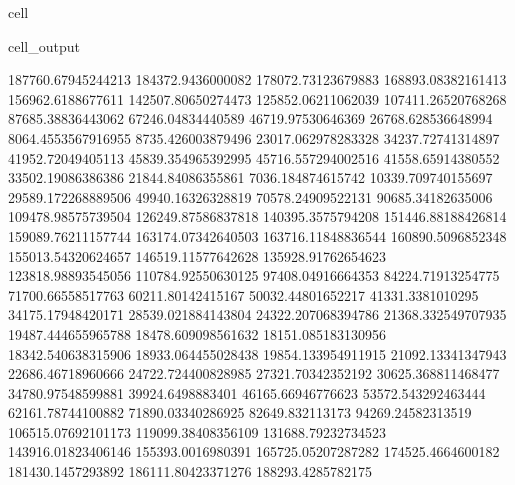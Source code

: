 \documentclass[letterpaper,10pt,english]{jupyterBook}
\begin{document}
\begin{sphinxuseclass}{cell}
\begin{sphinxVerbatimOutput}
\begin{sphinxuseclass}{cell_output}
\begin{sphinxVerbatim}[commandchars=\\\{\}]
187760.67945244213  184372.9436000082  178072.73123679883  168893.08382161413  156962.6188677611  142507.80650274473  125852.06211062039  107411.26520768268  87685.38836443062  67246.04834440589  46719.97530646369  26768.628536648994  8064.4553567916955  \PYGZhy{}8735.426003879496  \PYGZhy{}23017.062978283328  \PYGZhy{}34237.72741314897  \PYGZhy{}41952.72049405113  \PYGZhy{}45839.354965392995  \PYGZhy{}45716.557294002516  \PYGZhy{}41558.65914380552  \PYGZhy{}33502.19086386386  \PYGZhy{}21844.84086355861  \PYGZhy{}7036.184874615742  10339.709740155697  29589.172268889506  49940.16326328819  70578.24909522131  90685.34182635006  109478.98575739504  126249.87586837818  140395.3575794208  151446.88188426814  159089.76211157744  163174.07342640503  163716.11848836544  160890.5096852348  155013.54320624657  146519.11577642628  135928.91762654623  123818.98893545056  110784.92550630125  97408.04916664353  84224.71913254775  71700.66558517763  60211.80142415167  50032.44801652217  41331.3381010295  34175.17948420171  28539.021884143804  24322.207068394786  21368.332549707935  19487.444655965788  18478.609098561632  18151.085183130956  18342.540638315906  18933.064455028438  19854.133954911915  21092.13341347943  22686.46718960666  24722.724400828985  27321.70342352192  30625.368811468477  34780.97548599881  39924.6498883401  46165.66946776623  53572.543292463444  62161.78744100882  71890.03340286925  82649.832113173  94269.24582313519  106515.07692101173  119099.38408356109  131688.79232734523  143916.01823406146  155393.0016980391  165725.05207287282  174525.4664600182  181430.1457293892  186111.80423371276  188293.4285782175  

\end{sphinxVerbatim}
\end{sphinxuseclass}
\end{sphinxVerbatimOutput}
\end{sphinxuseclass}
\end{document}
